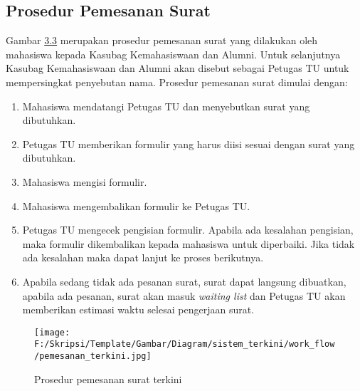 \subsection{Prosedur Pemesanan Surat}
\label{sec:prosedur_pemesanan_surat}
Gambar \hyperlink{pemesanan_terkini}{3.3} merupakan prosedur pemesanan surat yang dilakukan oleh mahasiswa kepada Kasubag Kemahasiswaan dan Alumni. Untuk selanjutnya Kasubag Kemahasiswaan dan Alumni akan disebut sebagai Petugas TU untuk mempersingkat penyebutan nama. Prosedur pemesanan surat dimulai dengan:
\begin{enumerate}
	\item Mahasiswa mendatangi Petugas TU dan menyebutkan surat yang dibutuhkan.
	\item Petugas TU memberikan formulir yang harus diisi sesuai dengan surat yang dibutuhkan.
	\item Mahasiswa mengisi formulir.
	\item Mahasiswa mengembalikan formulir ke Petugas TU.
	\item Petugas TU mengecek pengisian formulir. Apabila ada kesalahan pengisian, maka formulir dikembalikan kepada mahasiswa untuk diperbaiki. Jika tidak ada kesalahan maka dapat lanjut ke proses berikutnya.
	\item Apabila sedang tidak ada pesanan surat, surat dapat langsung dibuatkan, apabila ada pesanan, surat akan masuk \textit{waiting list} dan Petugas TU akan memberikan estimasi waktu selesai pengerjaan surat.
\end{enumerate}

\begin{figure}[H]
	\centering
		\texttt{[image: F:/Skripsi/Template/Gambar/Diagram/sistem\_terkini/work\_flow/pemesanan\_terkini.jpg]}
	{\caption{Prosedur pemesanan surat terkini}}
	\label{fig:pemesanan_terkini}
\end{figure}

